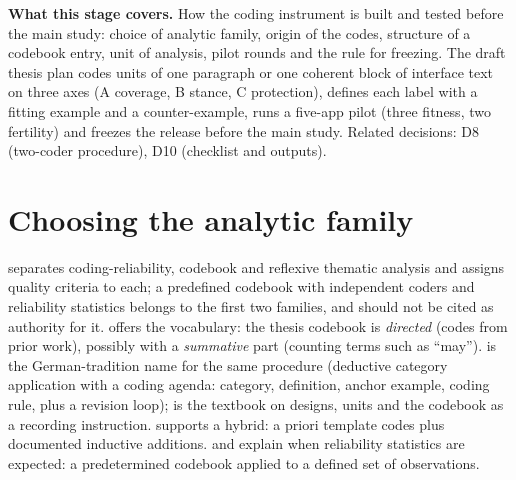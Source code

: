 
\noindent\textbf{What this stage covers.} How the coding instrument is built and tested before the main study: choice of analytic family, origin of the codes, structure of a codebook entry, unit of analysis, pilot rounds and the rule for freezing. The draft thesis plan codes units of one paragraph or one coherent block of interface text on three axes (A coverage, B stance, C protection), defines each label with a fitting example and a counter-example, runs a five-app pilot (three fitness, two fertility) and freezes the release before the main study. Related decisions: D8 (two-coder procedure), D10 (checklist and outputs).

\section{Choosing the analytic family}
 separates coding-reliability, codebook and reflexive thematic analysis and assigns quality criteria to each; a predefined codebook with independent coders and reliability statistics belongs to the first two families, and  should not be cited as authority for it.  offers the vocabulary: the thesis codebook is \emph{directed} (codes from prior work), possibly with a \emph{summative} part (counting terms such as ``may'').  is the German-tradition name for the same procedure (deductive category application with a coding agenda: category, definition, anchor example, coding rule, plus a revision loop);  is the textbook on designs, units and the codebook as a recording instruction.  supports a hybrid: a priori template codes plus documented inductive additions.  and  explain when reliability statistics are expected: a predetermined codebook applied to a defined set of observations.

